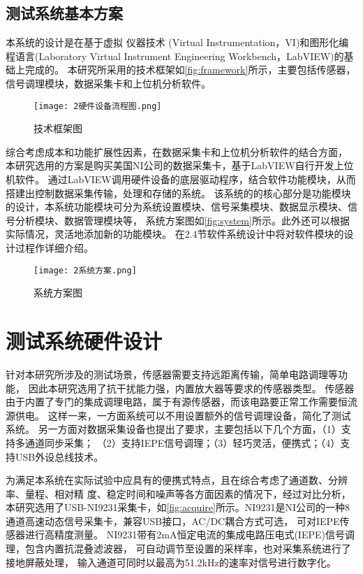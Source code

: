 \subsection{测试系统基本方案}
本系统的设计是在基于虚拟
仪器技术 (Virtual Instrumentation，VI)和图形化编
程语言(Laboratory Virtual Instrument Engineering
Workbench，LabVIEW)的基础上完成的。
本研究所采用的技术框架如\autoref{fig:framework}所示，主要包括传感器，信号调理模块，数据采集卡和上位机分析软件。
\begin{figure}[htbp]
    \centering
    \texttt{[image: 2硬件设备流程图.png]}
    \caption{\label{fig:framework}技术框架图}
\end{figure}
综合考虑成本和功能扩展性因素，在数据采集卡和上位机分析软件的结合方面，
本研究选用的方案是购买美国NI公司的数据采集卡，基于LabVIEW自行开发上位机软件。
通过LabVIEW调用硬件设备的底层驱动程序，结合软件功能模块，从而搭建出控制数据采集传输，处理和存储的系统。
该系统的的核心部分是功能模块的设计，本系统功能模块可分为系统设置模块、信号采集模块、数据显示模块、信号分析模块、数据管理模块等，
系统方案图如\autoref{fig:system}所示。此外还可以根据实际情况，灵活地添加新的功能模块。
在2.4节软件系统设计中将对软件模块的设计过程作详细介绍。
\begin{figure}[htbp]
    \centering
    \texttt{[image: 2系统方案.png]}
    \caption{\label{fig:system}系统方案图}
\end{figure}

\section{测试系统硬件设计}
针对本研究所涉及的测试场景，传感器需要支持远距离传输，简单电路调理等功能，
因此本研究选用了抗干扰能力强，内置放大器等要求的传感器类型。
传感器由于内置了专门的集成调理电路，属于有源传感器，而该电路要正常工作需要恒流源供电。
这样一来，一方面系统可以不用设置额外的信号调理设备，简化了测试系统。
另一方面对数据采集设备也提出了要求，主要包括以下几个方面，（1）支持多通道同步采集；
（2）支持IEPE信号调理；（3）轻巧灵活，便携式；（4）支持USB外设总线技术。

为满足本系统在实际试验中应具有的便携式特点，且在综合考虑了通道数、分辨率、量程、相对精
度、稳定时间和噪声等各方面因素的情况下，经过对比分析，
本研究选用了USB-​NI9231采集卡，如\autoref{fig:acquire}所示。
​NI9231是NI公司的一种8通道高速动态信号采集卡，兼容USB接口，AC/DC耦合方式可选，
可对IEPE传感器进行高精度测量。
NI9231带有2mA恒定电流的集成电路压电式(IEPE)信号调理，包含内置抗混叠滤波器，
可自动调节至设置的采样率，也对采集系统进行了接地屏蔽处理，
输入通道可同时以最高为51.2$\mathrm{kHz}$的速率对信号进行数字化。

